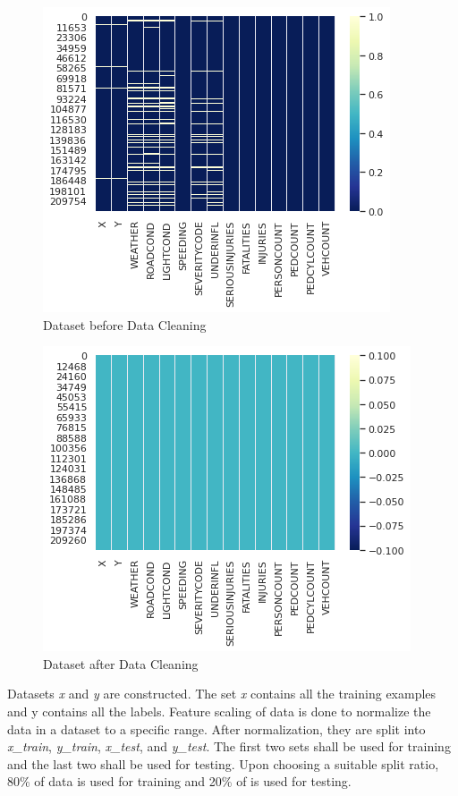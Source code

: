 \documentclass{article}
\begin{document}
\begin{figure}[H]
  \centering
  \includegraphics[scale=0.6]{blanks1.png}
  \caption{Dataset before Data Cleaning}
\end{figure}

\begin{figure}[H]
  \centering
  \includegraphics[scale=0.6]{blanks2.png}
  \caption{Dataset after Data Cleaning}
\end{figure}

Datasets \emph{x} and \emph{y} are constructed. The set \emph{x} contains all the training examples and y contains all the labels. Feature scaling of data is done to normalize the data in a dataset to a specific range. After normalization, they are split into \emph{x\_train},\emph{ y\_train}, \emph{x\_test}, and \emph{y\_test}. The first two sets shall be used for training and the last two shall be used for testing. Upon choosing a suitable split ratio, 80\% of data is used for training and 20\% of is used for testing.
\end{document}
